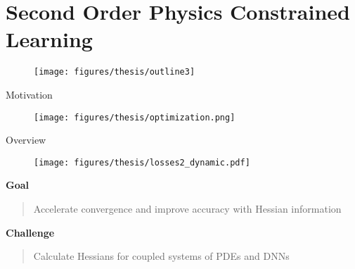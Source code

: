 \documentclass[usenames,dvipsnames]{beamer}
\begin{document}
\section{Second Order Physics Constrained Learning}



\begin{frame}	
	
	\begin{figure}[hbt]
		\centering
		\texttt{[image: figures/thesis/outline3]}
	\end{figure}
\end{frame}


\begin{frame}{Motivation}


	
\begin{figure}
	\centering
	\texttt{[image: figures/thesis/optimization.png]}
\end{figure}




\end{frame}

\begin{frame}{Overview}
		\begin{figure}[htbp]
		\centering
		\texttt{[image: figures/thesis/losses2\_dynamic.pdf]}
	\end{figure}
	
	\vspace{-0.4cm} 
	
	\textbf{Goal}
	
	\vspace{0.2cm} 
	
\begin{quote}
	Accelerate convergence and improve accuracy with Hessian information
\end{quote}

\textbf{Challenge}

\vspace{0.2cm} 

\begin{quote}
Calculate Hessians for coupled systems of PDEs and DNNs
\end{quote}

\end{frame}
\end{document}
